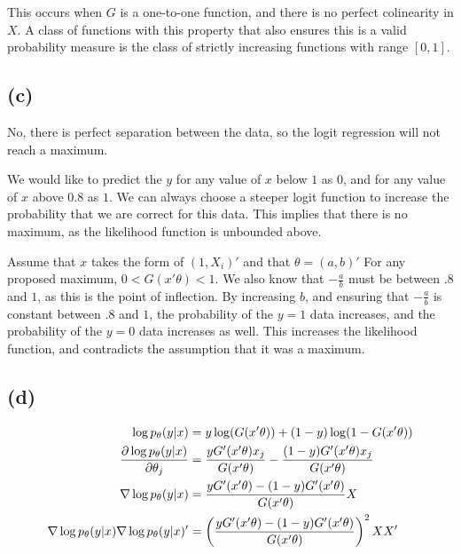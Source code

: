 \documentclass[12pt]{paper}
\begin{document}
This occurs when $G$ is a one-to-one function, and there is no perfect
colinearity in $X$. A class of functions with this property that also
ensures this is a valid probability measure is the class of strictly
increasing functions with range $[0,1]$.

\subsection{(c)}

No, there is perfect separation between the data, so the logit
regression will not reach a maximum.

We would like to predict the $y$ for any value of $x$ below $1$ as
$0$, and for any value of $x$ above $0.8$ as $1$. We can always choose
a steeper logit function to increase the probability that we are
correct for this data. This implies that there is no maximum, as the
likelihood function is unbounded above.

Assume that $x$ takes the form of $(1,X_i)'$ and that
$\theta = (a,b)'$ For any proposed maximum, $0 < G( x'\theta) < 1$. We also know
that $-\frac{a}{b}$ must be between $.8$ and $1$, as this is the point
of inflection. By increasing $b$, and ensuring that $-\frac{a}{b}$ is
constant between $.8$ and $1$, the probability of the $y=1$ data
increases, and the probability of the $y=0$ data increases as
well. This increases the likelihood function, and contradicts the
assumption that it was a maximum.

\subsection{(d)}

\begin{align*}
  \log p_{\theta}( y \vert x ) &= y \log( G(x'\theta) ) + (1-y) \log( 1 - G(x'\theta))\\
\frac{ \partial  \log p_{\theta} (y \vert x)}{ \partial \theta_j} &= \frac{y G'( x'\theta) x_j}{G(x'\theta)} -
                                   \frac{(1-y)G'(x'\theta) x_j}{G(x'\theta)}\\
\nabla \log p_{\theta}( y \vert x) &= \frac{y G'(x'\theta) - (1-y)G'(x'\theta)}{G(x'\theta)} X\\
\nabla \log p_{\theta}( y \vert x) \nabla \log p_{\theta}( y \vert x)' &= \left( \frac{y G'(x'\theta) -
                                             (1-y)G'(x'\theta)}{G(x'\theta)}
                                             \right)^2 X X'
\\
\end{align*}
\end{document}
